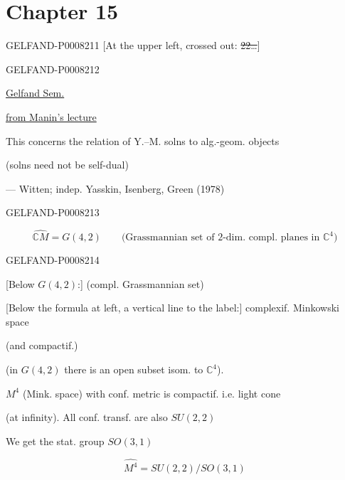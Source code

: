\section*{Chapter 15}
\begin{GelfandAdjacentEvidence}{GELFAND-P000821}{1}
[At the upper left, crossed out: \sout{22…}]
\end{GelfandAdjacentEvidence}
\begin{GelfandAdjacentEvidence}{GELFAND-P000821}{2}


 \qquad \uline{Gelfand Sem.}

 \quad \uline{from Manin’s lecture}

This concerns the relation of Y.–M. solns to alg.-geom. objects

(solns need not be self-dual)

— Witten; indep. Yasskin, Isenberg, Green (1978)
\end{GelfandAdjacentEvidence}
\begin{GelfandAdjacentEvidence}{GELFAND-P000821}{3}


\[
\widehat{\mathbb{C}M}=G(4,2)\qquad
\text{(Grassmannian set of 2-dim. compl. planes in \(\mathbb{C}^4\))}
\]
\end{GelfandAdjacentEvidence}
\begin{GelfandAdjacentEvidence}{GELFAND-P000821}{4}


[Below \(G(4,2)\):] (compl. Grassmannian set)

[Below the formula at left, a vertical line to the label:] complexif. Minkowski space

(and compactif.)

(in \(G(4,2)\) there is an open subset isom. to \(\mathbb{C}^4\)).


\(M^4\) (Mink. space) with conf. metric is compactif. i.e. light cone

(at infinity). All conf. transf. are also \(SU(2,2)\)

We get the stat. group \(SO(3,1)\)

\begin{equation*}
\widehat{M^4}=SU(2,2)/SO(3,1)\tag{1}
\end{equation*}
\end{GelfandAdjacentEvidence}
